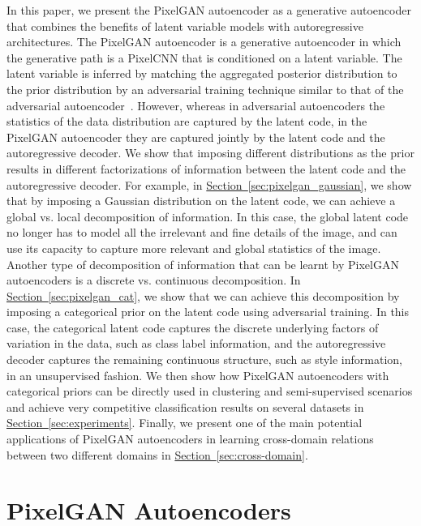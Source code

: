 \documentclass{article}
\newcommand{\mysec}[1]{\hyperref[sec:#1]{Section~\ref*{sec:#1}}}
\begin{document}
In this paper, we present the PixelGAN autoencoder as a generative autoencoder that combines the benefits of latent variable models with autoregressive architectures. The PixelGAN autoencoder is a generative autoencoder in which the generative path is a PixelCNN that is conditioned on a latent variable. The latent variable is inferred by matching the aggregated posterior distribution to the prior distribution by an adversarial training technique similar to that of the adversarial autoencoder~\citep{aae}. However, whereas in adversarial autoencoders the statistics of the data distribution are captured by the latent code, in the PixelGAN autoencoder they are captured jointly by the latent code and the autoregressive decoder.
We show that imposing different distributions as the prior results in different factorizations of information between the latent code and the autoregressive decoder. For example, in \mysec{pixelgan_gaussian}, we show that by imposing a Gaussian distribution on the latent code, we can achieve a global vs. local decomposition of information. In this case, the global latent code no longer has to model all the irrelevant and fine details of the image, and can use its capacity to capture more relevant and global statistics of the image.
Another type of decomposition of information that can be learnt by PixelGAN autoencoders is a discrete vs. continuous decomposition. In \mysec{pixelgan_cat}, we show that we can achieve this decomposition by imposing a categorical prior on the latent code using adversarial training. In this case, the categorical latent code captures the discrete underlying factors of variation in the data, such as class label information, and the autoregressive decoder captures the remaining continuous structure, such as style information, in an unsupervised fashion.
We then show how PixelGAN autoencoders with categorical priors can be directly used in clustering and semi-supervised scenarios and achieve very competitive classification results on several datasets in \mysec{experiments}.
Finally, we present one of the main potential applications of PixelGAN autoencoders in learning cross-domain relations between two different domains in \mysec{cross-domain}.


\section{PixelGAN Autoencoders}\label{sec:pixelgan}
\end{document}
